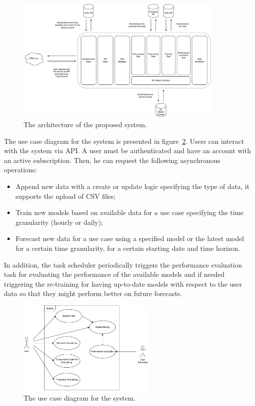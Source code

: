 \begin{figure}[H]
\centering 
\includegraphics[width=0.9\textwidth]{images/architecture_components}
\caption{The architecture of the proposed system.}
\label{fig:components}
\end{figure}

The use case diagram for the system is presented in figure~\ref{fig:usecase}.
Users can interact with the system via API.
A user must be authenticated and have an account with an active subscription.
Then, he can request the following asynchronous operations:
\begin{itemize}
  \item Append new data with a create or update logic specifying the type of data, it supports the upload of CSV files;
  \item Train new models based on available data for a use case specifying the time granularity (hourly or daily);
  \item Forecast new data for a use case using a specified model or the latest model for a certain time granularity, for a certain starting date and time horizon.
\end{itemize}

In addition, the task scheduler periodically triggers the performance evaluation task for evaluating the performance of the available models and if needed triggering the re-training for having up-to-date models with respect to the user data so that they might perform better on future forecasts.

\begin{figure}[H]
\centering 
\includegraphics[width=0.6\textwidth]{images/architecture_use_case}
\caption{The use case diagram for the system.}
\label{fig:usecase}
\end{figure}

